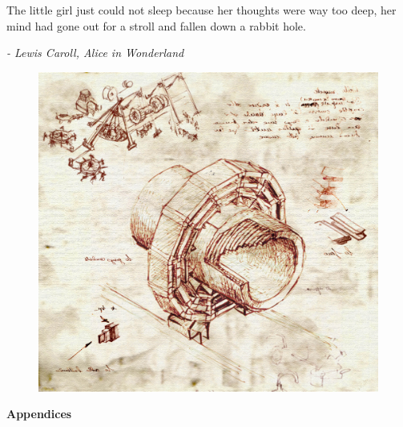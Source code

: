 \cleardoublepage\thispagestyle{empty}
\begin{center}
	\epigraph{The little girl just could not sleep because her thoughts were way too deep,  her mind had gone out for a stroll and fallen down a rabbit hole.}{\textit{- Lewis Caroll, Alice in Wonderland}}
	
	\vspace*{10mm}
     



\begin{figure}[th]
	\centering
	\includegraphics[width=1.\linewidth]{cover/oreach-2009-001}
\end{figure}
	\vspace{10mm}
	\huge \textbf{Appendices}
\vspace{10mm}



\end{center}

\cleardoublepage
\setlength{\topmargin}{0mm}
\normalsize%
